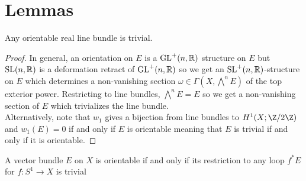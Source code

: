 \documentclass[12pt]{extarticle}
\begin{document}
\section{Lemmas}

\begin{prop} \label{orientation}
Any orientable real line bundle is trivial.
\end{prop}

\begin{proof}
In general, an orientation on $E$ is a $\mathrm{GL}^+(n, \mathbb{R})$ structure on $E$ but $\mathrm{SL}(n, \mathbb{R})$ is a deformation retract of $\mathrm{GL}^+(n, \mathbb{R})$ so we get an $\mathrm{SL}^+(n, \mathbb{R})$-structure on $E$ which determines a non-vanishing section $\omega \in \Gamma(X, \bigwedge^n E)$ of the top exterior power. Restricting to line bundles, $\bigwedge^n E = E$ so we get a non-vanishing section of $E$ which trivializes the line bundle. 
\bigskip\\
Alternatively, note that $w_1$ gives a bijection from line bundles to $H^1(X; \Z / 2 \Z)$ and $w_1(E) = 0$ if and only if $E$ is orientable meaning that $E$ is trivial if and only if it is orientable. 
\end{proof}

\begin{prop} \label{loop_restriction}
A vector bundle $E$ on $X$ is orientable if and only if its restriction to any loop $f^* E$ for $f : S^1 \to X$ is trivial 
\end{prop}
\end{document}
